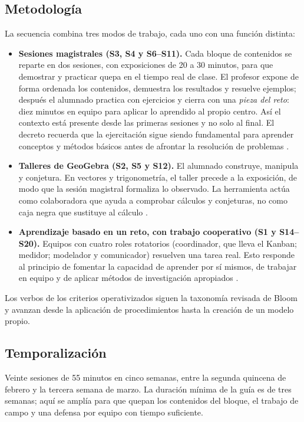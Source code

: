 \subsection{Metodología}
La secuencia combina tres modos de trabajo, cada uno con una función distinta:
\begin{itemize}
  \item \textbf{Sesiones magistrales (S3, S4 y S6--S11).} Cada bloque de contenidos se reparte en dos sesiones, con exposiciones de 20 a 30 minutos, para que demostrar y practicar quepa en el tiempo real de clase. El profesor expone de forma ordenada los contenidos, demuestra los resultados y resuelve ejemplos; después el alumnado practica con ejercicios y cierra con una \emph{pieza del reto}: diez minutos en equipo para aplicar lo aprendido al propio centro. Así el contexto está presente desde las primeras sesiones y no solo al final. El decreto recuerda que la ejercitación sigue siendo fundamental para aprender conceptos y métodos básicos antes de afrontar la resolución de problemas \parencite[p.~321]{decreto64}.
  \item \textbf{Talleres de GeoGebra (S2, S5 y S12).} El alumnado construye, manipula y conjetura. En vectores y trigonometría, el taller precede a la exposición, de modo que la sesión magistral formaliza lo observado. La herramienta actúa como colaboradora que ayuda a comprobar cálculos y conjeturas, no como caja negra que sustituye al cálculo \parencite[p.~321]{decreto64}.
  \item \textbf{Aprendizaje basado en un reto, con trabajo cooperativo (S1 y S14--S20).} Equipos con cuatro roles rotatorios (coordinador, que lleva el Kanban; medidor; modelador y comunicador) resuelven una tarea real. Esto responde al principio de fomentar la capacidad de aprender por sí mismos, de trabajar en equipo y de aplicar métodos de investigación apropiados \parencite[art.~4.1, p.~16]{decreto64}.
\end{itemize}
Los verbos de los criterios operativizados siguen la taxonomía revisada de Bloom \parencite{anderson2001} y avanzan desde la aplicación de procedimientos hasta la creación de un modelo propio.

\subsection{Temporalización}
Veinte sesiones de 55 minutos en cinco semanas, entre la segunda quincena de febrero y la tercera semana de marzo. La duración mínima de la guía es de tres semanas; aquí se amplía para que quepan los contenidos del bloque, el trabajo de campo y una defensa por equipo con tiempo suficiente.

